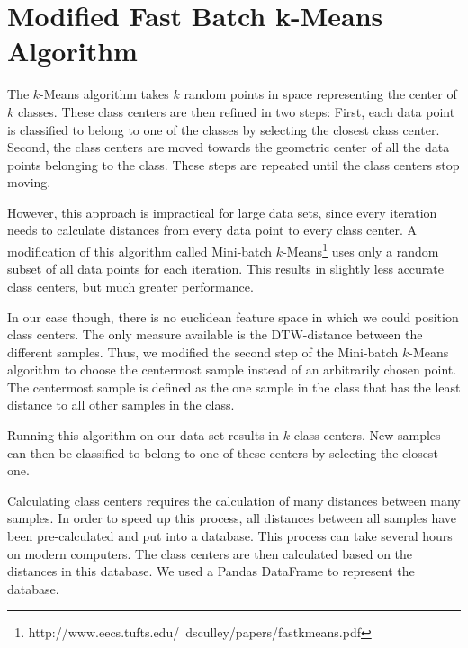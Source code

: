 \section{Modified Fast Batch k-Means Algorithm}
\label{sec:TheoryKMeans}

The $k$-Means algorithm takes $k$ random points in space representing the center of $k$ classes. These class centers are then refined in two steps: First, each data point is classified to belong to one of the classes by selecting the closest class center. Second, the class centers are moved towards the geometric center of all the data points belonging to the class. These steps are repeated until the class centers stop moving.

However, this approach is impractical for large data sets, since every iteration needs to calculate distances from every data point to every class center. A modification of this algorithm called Mini-batch $k$-Means\footnote{http://www.eecs.tufts.edu/~dsculley/papers/fastkmeans.pdf} uses only a random subset of all data points for each iteration. This results in slightly less accurate class centers, but much greater performance.

In our case though, there is no euclidean feature space in which we could position class centers. The only measure available is the DTW-distance between the different samples. Thus, we modified the second step of the Mini-batch $k$-Means algorithm to choose the centermost sample instead of an arbitrarily chosen point. The centermost sample is defined as the one sample in the class that has the least distance to all other samples in the class.

Running this algorithm on our data set results in $k$ class centers. New samples can then be classified to belong to one of these centers by selecting the closest one.

Calculating class centers requires the calculation of many distances between many samples. In order to speed up this process, all distances between all samples have been pre-calculated and put into a database. This process can take several hours on modern computers. The class centers are then calculated based on the distances in this database. We used a Pandas DataFrame to represent the database.

